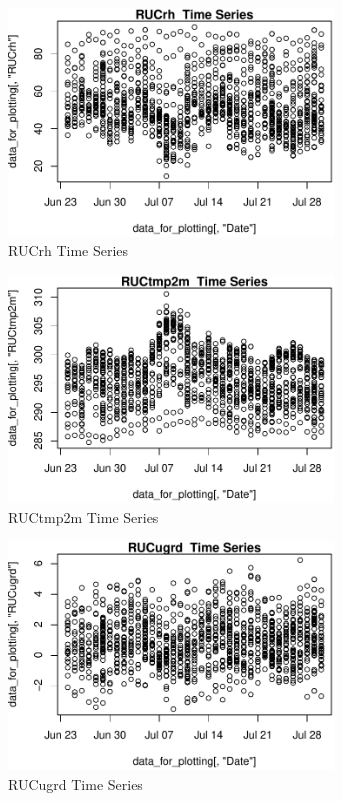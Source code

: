 \begin{figure} 
\centering  
\includegraphics[width=0.77\textwidth]{Code_Outputs/ML_input_report_AllforCaret_cleaned_StepPractice_part_practice_RUCrhTS.pdf} 
\caption{\label{fig:ML_input_report_AllforCaret_cleaned_StepPractice_part_practiceRUCrhTS}RUCrh  Time Series} 
\end{figure} 
 

\begin{figure} 
\centering  
\includegraphics[width=0.77\textwidth]{Code_Outputs/ML_input_report_AllforCaret_cleaned_StepPractice_part_practice_RUCtmp2mTS.pdf} 
\caption{\label{fig:ML_input_report_AllforCaret_cleaned_StepPractice_part_practiceRUCtmp2mTS}RUCtmp2m  Time Series} 
\end{figure} 
 

\begin{figure} 
\centering  
\includegraphics[width=0.77\textwidth]{Code_Outputs/ML_input_report_AllforCaret_cleaned_StepPractice_part_practice_RUCugrdTS.pdf} 
\caption{\label{fig:ML_input_report_AllforCaret_cleaned_StepPractice_part_practiceRUCugrdTS}RUCugrd  Time Series} 
\end{figure} 
 

